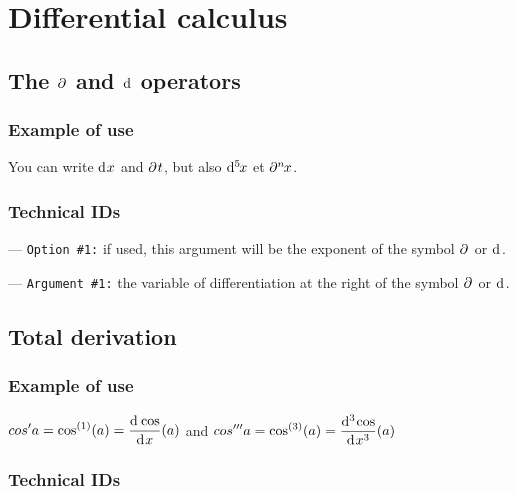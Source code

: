 \documentclass[12pt,a4paper]{article}
\makeatletter
\newcommand\IDmacro{\@ifstar{\@IDmacroStar}{\@IDmacroNoStar}}
\newcommand\@IDmacroNoStar[3]{%
        \texttt{%
        	\textbackslash#1%
        	\IfStrEq{#2}{0}{}{%
        		\,\,[#2 Option%
				\IfStrEq{#2}{1}{}{s}]%
			}%
    	    \,\,(#3 Argument%
				\IfStrEq{#3}{1}{}{s})%
	   	}
        \immediate\write\tempfile{macro@#1@#2@#3}%
    }
\newcommand\@IDmacroStar[2]{%
        \@IDmacroNoStar{#1}{0}{#2}%
    }
\newcommand\@IDoptarg[2]{%
    	\vspace{0.5em}
		--- \texttt{#1 \##2:}%
	}
\newcommand\IDoption[1]{%
    	\@IDoptarg{Option}{#1}%
	}
\newcommand\IDarg[1]{%
    	\@IDoptarg{Argument}{#1}%
	}
\newcommand{\@diffOpe}[3]{%
        #3%
        \IfStrEq{#1}{0}{}{^{#1}\!}%
        \IfBeginWith{#2}{f}{\!}{}%
        \hspace{0.07em}#2%
    }
\DeclareRobustCommand\@dder{
        \mathop{}\mathopen{}\mathrm{d}
    }
\newcommand\dd[2][0]{\@diffOpe{#1}{#2}{\@dder}}
\let\original@partial\partial
\renewcommand{\partial}{%
        \original@partial\mathopen{}%
    }
\newcommand\pp[2][0]{\@diffOpe{#1}{#2}{\partial}}
\newcommand\derpow[2][\relax]{
        \IfStrEq{#1}{\relax}{
            #2^{\left( 1 \right)}
        }{
            #2^{\left( #1 \right)}
        }
    }
\newcommand\derfrac[3][\relax]{
        \IfStrEq{#1}{\relax}{
            \frac{\dd{#2}}{\dd{#3}}
        }{
            \frac{\dd[#1]{#2}}{\dd{#3}^{#1}}
        }
    }
\makeatother
\begin{document}
\section{Differential calculus}

    \subsection{\texorpdfstring{The $\pp{}$ and $\dd{}$ operators}%
                               {The "rounded d" and "straight d" operators}}

        \subsubsection{Example of use}

\begin{tcblisting}{}
You can write $\dd{x}$ and $\pp{t}$, but also $ \dd[5]{x}$ et $\pp[n]{x}$.
\end{tcblisting}


        \subsubsection{Technical IDs}

\IDmacro{dd}{1}{1}

\IDmacro{pp}{1}{1}

\IDoption{1} if used, this argument will be the exponent of the symbol $\pp{}$ or $\dd{}$.

\IDarg{1} the variable of differentiation at the right of the symbol $\pp{}$ or $\dd{}$.



    \subsection{Total derivation}

        \subsubsection{Example of use}

\begin{tcblisting}{}
$\displaystyle cos' a = \derpow{\cos} (a) = \derfrac{\cos}{x} (a)$
and
$\displaystyle cos''' a = \derpow[3]{\cos} (a) = \derfrac[3]{\cos}{x} (a)$
\end{tcblisting}


        \subsubsection{Technical IDs}
\end{document}
